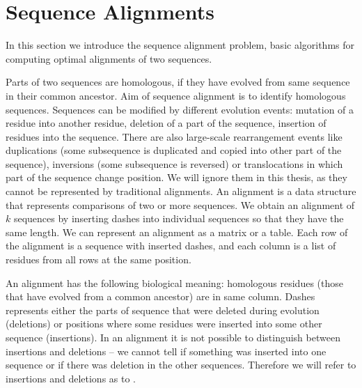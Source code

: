 \section{Sequence Alignments}

In this section we introduce the sequence alignment problem, basic algorithms
for computing optimal alignments of two sequences.

Parts of two sequences are homologous, if they have evolved from same sequence
in their common ancestor. Aim of sequence alignment is to identify homologous
sequences. Sequences can be modified by different evolution events:
mutation of a residue into another residue, deletion of a part of the sequence,
insertion of residues into the sequence. There are also large-scale
rearrangement events like duplications (some subsequence is duplicated and
copied into other part of the sequence), inversions (some subsequence is
reversed) or translocations in which part of the sequence change position.  We will
ignore them in this thesis, as they cannot be represented by traditional
alignments. An alignment is a data structure that represents comparisons of two
or more sequences. We obtain an alignment of $k$ sequences by inserting dashes
into individual sequences so that they have the same length. We can represent an
alignment as a matrix or a table. Each row of the alignment is a sequence with
inserted dashes, and each column is a list of residues from all rows at the same
position.


An alignment has the following biological meaning: homologous residues (those that
have evolved from a common ancestor) are in same column. Dashes represents
either the parts of sequence that were deleted during evolution (deletions) or
positions where some residues were inserted into some other sequence
(insertions). In an alignment it is not possible to distinguish between insertions and
deletions -- we cannot tell if something was inserted into one sequence or if
there was deletion in the other sequences. Therefore we will refer to insertions
and deletions as to .

